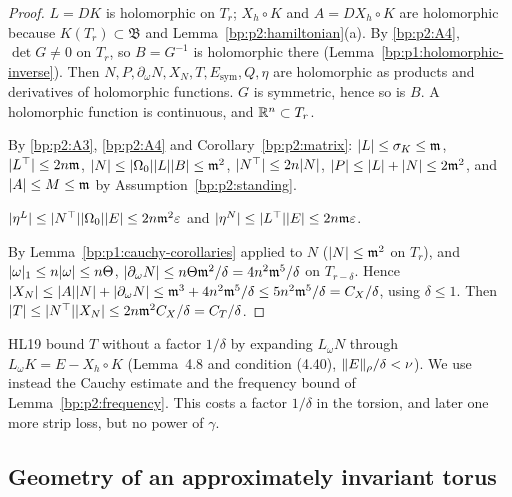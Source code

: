 \begin{proof}
\label{step:p2:fb-holo}
$L=DK$ is holomorphic on $T_r$; $X_h\circ K$ and $A=DX_h\circ K$ are holomorphic because $K(T_r)\subset
\mathfrak B$ and Lemma~\ref{bp:p2:hamiltonian}(a). By \ref{bp:p2:A4}, $\det G\ne0$ on $T_r$, so
$B=G^{-1}$ is holomorphic there (Lemma~\ref{bp:p1:holomorphic-inverse}). Then $N,P,\partial_\omega
N,X_N,T,E_{\mathrm{sym}},Q,\eta$ are holomorphic as products and derivatives of holomorphic functions.
$G$ is symmetric, hence so is $B$. A holomorphic function is continuous, and $\mathbb{R}^n\subset T_r$.

\label{step:p2:fb-bounds}
By \ref{bp:p2:A3}, \ref{bp:p2:A4} and Corollary~\ref{bp:p2:matrix}: $\lvert L\rvert\le\sigma_K\le\mathfrak m$,
$\lvert L^\top\rvert\le2n\mathfrak m$, $\lvert N\rvert\le\lvert \Omega_0\rvert\lvert L\rvert\lvert B\rvert\le\mathfrak m^2$, $\lvert N^\top\rvert\le
2n\lvert N\rvert$, $\lvert P\rvert\le\lvert L\rvert+\lvert N\rvert\le2\mathfrak m^2$, and $\lvert A\rvert\le M\le\mathfrak m$ by
Assumption~\ref{bp:p2:standing}.

\label{step:p2:fb-eta}
$\lvert \eta^L\rvert\le\lvert N^\top\rvert\lvert \Omega_0\rvert\lvert E\rvert\le2n\mathfrak m^2\varepsilon$ and
$\lvert \eta^N\rvert\le\lvert L^\top\rvert\lvert E\rvert\le2n\mathfrak m\varepsilon$.

\label{step:p2:fb-torsion}
By Lemma~\ref{bp:p1:cauchy-corollaries} applied to $N$ ($\lvert N\rvert\le\mathfrak m^2$ on $T_r$), and
$\lvert \omega\rvert_1\le n\lvert \omega\rvert\le n\Theta$, $\lvert \partial_\omega N\rvert\le n\Theta\mathfrak m^2/\delta=4n^2\mathfrak
m^5/\delta$ on $T_{r-\delta}$.
Hence $\lvert X_N\rvert\le\lvert A\rvert\lvert N\rvert+\lvert \partial_\omega N\rvert\le\mathfrak m^3+4n^2\mathfrak m^5/\delta\le
5n^2\mathfrak m^5/\delta=C_X/\delta$, using $\delta\le1$. Then $\lvert T\rvert\le\lvert N^\top\rvert\lvert X_N\rvert\le
2n\mathfrak m^2C_X/\delta=C_T/\delta$.
\end{proof}

\begin{remark}\label{bp:p2:torsion-route}
HL19 bound $T$ without a factor $1/\delta$ by expanding $L_\omega N$ through $L_\omega K=E-X_h\circ K$
(Lemma~4.8 and condition (4.40), $\lVert E\rVert_\rho/\delta<\nu$). We use instead the Cauchy estimate and the
frequency bound of Lemma~\ref{bp:p2:frequency}. This costs a factor $1/\delta$ in the torsion, and later
one more strip loss, but no power of $\gamma$.
\end{remark}

\subsection{Geometry of an approximately invariant torus}\label{bp:p2:sec-geometry}

